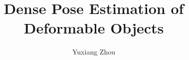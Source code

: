 \documentclass[a4paper,12pt,twoside]{report}
\begin{document}
\title{\LARGE {\bf Dense Pose Estimation of Deformable Objects}\\
    \vspace*{6mm}
}

\author{Yuxiang Zhou}

\normallinespacing
\maketitle

\preface
% 
% 
% 
% 

\dominitoc
\body
% 
% 

% 

% 
% 

\appendix



\end{document}
